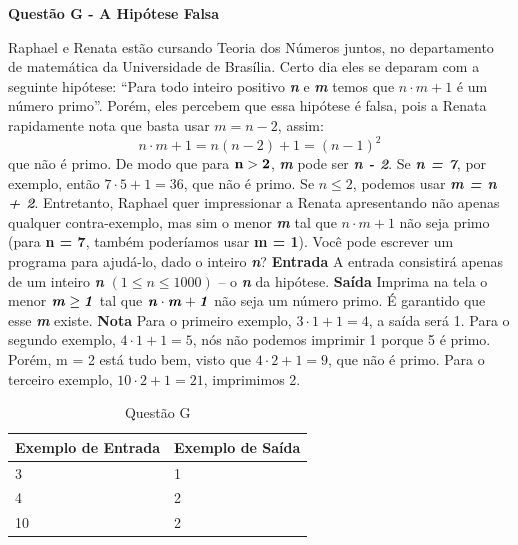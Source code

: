 \documentclass[a4paper, 12pt]{article}
\begin{document}
\newpage %
\begin{center}
\textbf{{\Large Questão G - A Hipótese Falsa}}
\end{center}
\vspace{5pt}
Raphael e Renata estão cursando Teoria dos Números juntos, no departamento de matemática da Universidade de Brasília. Certo dia eles se deparam com a seguinte hipótese: ``Para todo inteiro positivo \textbf{\textit{n}} e \textbf{\textit{m}} temos que $n\cdot m + 1$ é um número primo''. Porém, eles percebem que essa hipótese é falsa, pois a Renata rapidamente nota que basta usar $m = n - 2$, assim:
$$n\cdot m + 1 = n(n - 2) + 1 = {(n - 1)}^2 $$ que não é primo. \newline \newline
De modo que para $\textrm{\textbf{n}} > \textrm{\textbf{2}}$, \textbf{\textit{m}} pode ser \textbf{\textit{n - 2}}. Se \textbf{\textit{n = 7}}, por exemplo, então $7\cdot 5 + 1 = 36$, que não é primo. Se $n \leq 2$, podemos usar \textbf{\textit{m = n + 2}}.
Entretanto, Raphael quer impressionar a Renata apresentando não apenas qualquer contra-exemplo, mas sim o menor \textbf{\textit{m}} tal que $n\cdot m + 1$ não seja primo (para \textbf{n = 7}, também poderíamos usar \textbf{m = 1}). \newline \newline
Você pode escrever um programa para ajudá-lo, dado o inteiro \textbf{\textit{n}}?
\newline \newline
\textbf{{\large Entrada}} \newline
A entrada consistirá apenas de um inteiro \textbf{\textit{n}} $(1 \leq n \leq 1000)$ – o \textbf{\textit{n}} da hipótese.
\newline \newline
\textbf{{\large Saída}} \newline
Imprima na tela o menor $\textrm{\textbf{\textit{m}}} \geq \textrm{\textbf{\textit{1}}}$ tal que 
$\textrm{\textbf{\textit{n}}}\cdot \textrm{\textbf{\textit{m}}} + \textrm{\textbf{\textit{1}}}$ não seja um número primo. É garantido que esse \textbf{\textit{m}} existe.
\newline \newline
\textbf{{\large Nota}} \newline
Para o primeiro exemplo, $3\cdot 1 + 1 = 4$, a saída será 1. \newline
Para o segundo exemplo, $4\cdot 1 + 1 = 5$, nós não podemos imprimir 1 porque 5 é primo. Porém, m = 2 está tudo bem, visto que $4\cdot 2 + 1 = 9$, que não é primo. \newline
Para o terceiro exemplo, $10\cdot 2 + 1 = 21$, imprimimos 2.
\newline
\begin{table}[H]
	\centering
	\begin{tabular}{|l|l|}
	\hline
	\textbf{Exemplo de Entrada} & \textbf{Exemplo de Saída} \\ \hline
	3 & 1 \\ \hline
	4 & 2 \\ \hline
	10 & 2 \\ \hline
	\end{tabular}
	\caption{Questão G}
	\label{tabela7}
\end{table}
\end{document}
